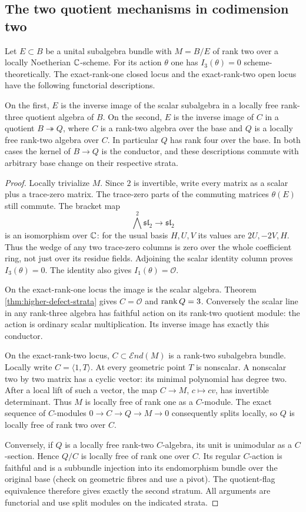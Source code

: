 \subsection{The two quotient mechanisms in codimension two}
\begin{theorem}
\label{thm:codimension-two}
Let $E\subset B$ be a unital subalgebra bundle with $M=B/E$ of rank
two over a locally Noetherian $\mathbb C$-scheme. For its action $\theta$
one has $I_3(\theta)=0$ scheme-theoretically. The exact-rank-one
closed locus and the exact-rank-two open locus have the following
functorial descriptions.

On the first, $E$ is the inverse image of the scalar subalgebra in
a locally free rank-three quotient algebra of $B$.
On the second, $E$ is the inverse image of $C$ in a quotient
$B\twoheadrightarrow Q$, where $C$ is a rank-two algebra over the
base and $Q$ is a locally free rank-two algebra over $C$. In particular
$Q$ has rank four over the base. In both cases the kernel of
$B\to Q$ is the conductor, and these descriptions commute with
arbitrary base change on their respective strata.
\end{theorem}
\begin{proof}
Locally trivialize $M$. Since $2$ is invertible, write every matrix
as a scalar plus a trace-zero matrix. The trace-zero parts of the
commuting matrices $\theta(E)$ still commute. The bracket map
\[
 \bigwedge^2\mathfrak {sl}_2\longrightarrow\mathfrak {sl}_2
\]
is an isomorphism over $\mathbb C$: for the usual basis $H,U,V$ its values
are $2U,-2V,H$. Thus the wedge of any two trace-zero columns is zero
over the whole coefficient ring, not just over its residue fields.
Adjoining the scalar identity column proves $I_3(\theta)=0$.
The identity also gives $I_1(\theta)=\mathcal O$.

On the exact-rank-one locus the image is the scalar algebra. Theorem~
\ref{thm:higher-defect-strata} gives $C=\mathcal O$ and $\operatorname{rank} Q=3$.
Conversely the scalar line in any rank-three algebra has faithful
action on its rank-two quotient module: the action is ordinary scalar
multiplication. Its inverse image has exactly this conductor.

On the exact-rank-two locus, $C\subset\mathcal E nd(M)$ is a rank-two
subalgebra bundle. Locally write $C=\langle1,T\rangle$. At every
geometric point $T$ is nonscalar. A nonscalar two by two matrix has
a cyclic vector: its minimal polynomial has degree two. After a
local lift of such a vector, the map $C\to M$, $c\mapsto cv$, has
invertible determinant. Thus $M$ is locally free of rank one as a
$C$-module. The exact sequence of $C$-modules
$0\to C\to Q\to M\to0$ consequently splits locally, so $Q$ is
locally free of rank two over $C$.

Conversely, if $Q$ is a locally free rank-two $C$-algebra, its unit
is unimodular as a $C$-section. Hence $Q/C$ is locally free of rank
one over $C$. Its regular $C$-action is faithful and is a subbundle
injection into its endomorphism bundle over the original base
(check on geometric fibres and use a pivot). The quotient-flag
equivalence therefore gives exactly the second stratum. All arguments
are functorial and use split modules on the indicated strata.
\end{proof}

